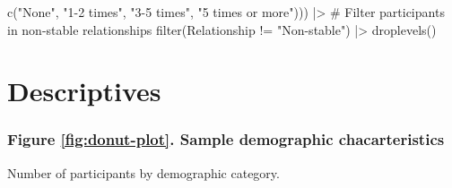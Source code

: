 \documentclass[
  bookmarksnumbered]{article}
\newenvironment{Shaded}{\begin{snugshade}}{\end{snugshade}}
\newcommand{\CommentTok}[1]{\textcolor[rgb]{0.50,0.62,0.50}{#1}}
\newcommand{\FunctionTok}[1]{\textcolor[rgb]{0.94,0.94,0.56}{#1}}
\newcommand{\NormalTok}[1]{\textcolor[rgb]{0.80,0.80,0.80}{#1}}
\newcommand{\SpecialCharTok}[1]{\textcolor[rgb]{0.86,0.64,0.64}{#1}}
\newcommand{\StringTok}[1]{\textcolor[rgb]{0.80,0.58,0.58}{#1}}
\begin{document}
\begin{Shaded}
\begin{Highlighting}[]
                                 \FunctionTok{c}\NormalTok{(}\StringTok{"None"}\NormalTok{, }\StringTok{"1{-}2 times"}\NormalTok{, }
                                   \StringTok{"3{-}5 times"}\NormalTok{, }\StringTok{"5 times or more"}\NormalTok{))) }\SpecialCharTok{|\textgreater{}} 
  \CommentTok{\# Filter participants in non{-}stable relationships}
  \FunctionTok{filter}\NormalTok{(Relationship }\SpecialCharTok{!=} \StringTok{"Non{-}stable"}\NormalTok{) }\SpecialCharTok{|\textgreater{}}
  \FunctionTok{droplevels}\NormalTok{()}
\end{Highlighting}
\end{Shaded}

\newpage

\hypertarget{descriptives}{%
\section{Descriptives}\label{descriptives}}

\hypertarget{figure-reffigdonut-plot.-sample-demographic-chacarteristics}{%
\subsubsection{Figure \ref{fig:donut-plot}. Sample demographic chacarteristics}\label{figure-reffigdonut-plot.-sample-demographic-chacarteristics}}

Number of participants by demographic category.
\end{document}
